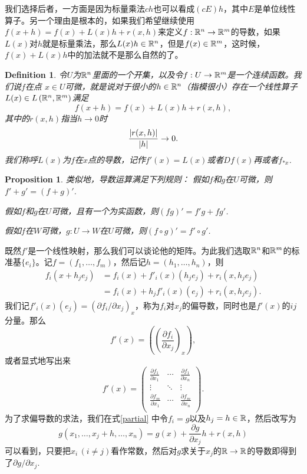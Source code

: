 \documentclass[11pt]{extbook}
\theoremstyle{plain}%
\newtheorem{pro}{Proposition}[section]%
\newtheorem{defi}{Definition}[section]%
\begin{document}
我们选择后者，一方面是因为标量乘法$ch$也可以看成$(cE)h$，其中$E$是单位线性算子。另一个理由是根本的，如果我们希望继续使用$f(x+h)=f(x)+L(x)h+r(x,h)$来定义$f:\mathbb{R}^n \to \mathbb{R}^m$的导数，如果$L(x)$对$h$就是标量乘法，那么$L(x)h\in \mathbb{R}^n$，但是$f(x)\in \mathbb{R}^m$，这时候，$f(x)+L(x)h$中的加法就不是那么自然的了。
\begin{defi}
	令$U$为$\mathbb{R}^n$里面的一个开集，以及令$f:U\rightarrow \mathbb{R}^m$是一个连续函数。我们说$f$在点 $x \in U$可微，就是说对于很小的$h \in \mathbb{R}^n$（指模很小）存在一个线性算子$L(x)\in L\left(\mathbb{R}^n,\mathbb{R}^m\right)$满足
	\begin{equation}
		f(x+h)=f(x)+L(x)h+r(x,h),
	\end{equation}
	其中的$r(x,h)$指当$h\to 0$时
	\begin{equation}
		\frac{\arrowvert r(x,h) \arrowvert}{\arrowvert h \arrowvert} \to 0.
	\end{equation}
	我们称呼$L(x)$为$f$在$x$点的导数，记作$f'(x)=L(x)$或者$Df(x)$再或者$f_{*x}$.
\end{defi}
\begin{pro}
	类似地，导数运算满足下列规则：	
	假如$f$和$g$在$U$可微，则$f'+g'=(f+g)'$.
	
	假如$f$和$g$在$U$可微，且有一个为实函数，则$(fg)'=f'g+fg'$.
	
	假如$f$在$W$可微，$g:U\to W$在$U$可微，则$(f\circ g)'=f'\circ g'$.
\end{pro}
既然$f'$是一个线性映射，那么我们可以谈论他的矩阵。为此我们选取$\mathbb{R}^n$和$\mathbb{R}^m$的标准基$\{e_i\}$。记$f=(f_1,\dots,f_m)$，然后记$h=(h_1,\dots,h_n)$，则
\begin{equation}
	\begin{split}
		f_i(x+h_je_j)&=f_i(x)+f'_i(x)\left(h_je_j\right)+r_i(x,h_je_j)\\
		&=f_i(x)+h_jf'_i(x)\left(e_j\right)+r_i(x,h_je_j).
	\end{split}
	\label{partial}
\end{equation}
我们记$f'_i(x)\left(e_j\right)=\left(\partial f_i/\partial x_j\right)_x$，称为$f_i$对$x_j$的偏导数，同时也是$f'(x)$的$ij$分量。那么
\[
	f'(x)=\left(\left(\frac{\partial f_i}{\partial x_j}\right)_x\right),
\]
或者显式地写出来
\[
	f'(x)=
		\begin{pmatrix}
			\displaystyle{\frac{\partial f_1}{\partial x_1}}&\cdots&\displaystyle{\frac{\partial f_1}{\partial x_n}}\\
			\vdots&\ddots&\vdots\\
			\displaystyle{\frac{\partial f_m}{\partial x_1}}&\cdots&\displaystyle{\frac{\partial f_m}{\partial x_n}}\\
		\end{pmatrix}.
\]
为了求偏导数的求法，我们在式\eqref{partial} 中令$f_i=g$以及$h_j=h\in \mathbb{R}$，然后改写为
\[
	g(x_1,\dots,x_j+h,\dots,x_n)=g(x)+\frac{\partial g}{\partial x_j}h+r(x,h)
\]
可以看到，只要把$x_i\,(i\neq j)$看作常数，然后对$g$求关于$x_j$的$\mathbb{R}\to \mathbb{R}$的导数即得到了$\partial g/\partial x_j$.
\end{document}
